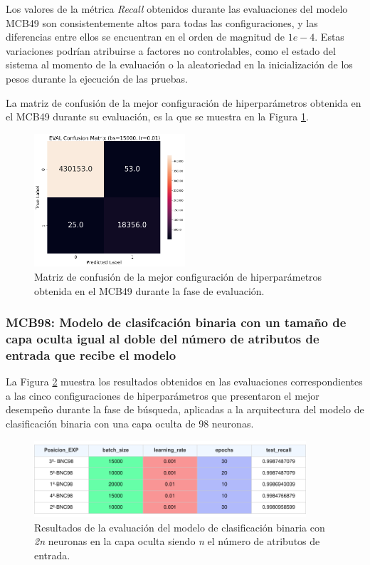 Los valores de la métrica \textit{Recall} obtenidos durante las evaluaciones del modelo MCB49 son consistentemente altos para todas las configuraciones, y las diferencias entre ellos se encuentran en el orden de magnitud de $1e-4$. Estas variaciones podrían atribuirse a factores no controlables, como el estado del sistema al momento de la evaluación o la aleatoriedad en la inicialización de los pesos durante la ejecución de las pruebas.

La matriz de confusión de la mejor configuración de hiperparámetros obtenida en el MCB49 durante su evaluación, es la que se muestra en la Figura \ref{fig:MC_EVAL_MCB49}.

\begin{figure}[H]
    \centering
    \includegraphics[width=0.5\textwidth]{./img/evaluacion/matrices_confusion/MC_EVAL_MCB49.png}
    \caption{Matriz de confusión de la mejor configuración de hiperparámetros obtenida en el MCB49 durante la fase de evaluación.}
    \label{fig:MC_EVAL_MCB49}
\end{figure}



\subsubsection{MCB98: Modelo de clasifcación binaria con un tamaño de capa oculta igual al doble del número de atributos de entrada que recibe el modelo}
La Figura \ref{fig:EVALMCB98} muestra los resultados obtenidos en las evaluaciones correspondientes a las cinco configuraciones de hiperparámetros que presentaron el mejor desempeño durante la fase de búsqueda, aplicadas a la arquitectura del modelo de clasificación binaria con una capa oculta de 98 neuronas.

\begin{figure}[H]
    \centering
    \includegraphics[width=0.9\textwidth]{./img/evaluacion/resultados/EVALMCB98.pdf}
    \caption{Resultados de la evaluación del modelo de clasificación binaria con \textit{2n} neuronas en la capa oculta siendo \textit{n} el número de atributos de entrada.}
    \label{fig:EVALMCB98}
\end{figure}

